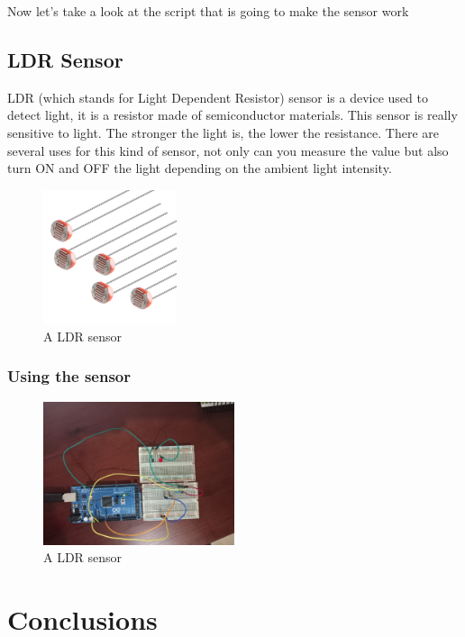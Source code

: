 Now let's take a look at the script that is going to make the sensor work



\subsection{LDR Sensor}
LDR (which stands for Light Dependent Resistor) sensor is a device used to detect light, it is a resistor made of semiconductor materials. This sensor is really sensitive to light. The stronger the light is, the lower the resistance. There are several uses for this kind of sensor, not only can you measure the value but also turn ON and OFF the light depending on the ambient light intensity.

\begin{figure}[htp]
    \centering
    \includegraphics[width=0.35\textwidth]{fig/ldr.jpg}
    \caption{A LDR sensor}
    \label{fig:ldr}
\end{figure}

\subsubsection{Using the sensor}

\begin{figure}[htp]
    \centering
    \includegraphics[width=0.5\textwidth]{fig/ldr-circuit.jpg}
    \caption{A LDR sensor}
    \label{fig:ldr}
\end{figure}




\section{Conclusions}


